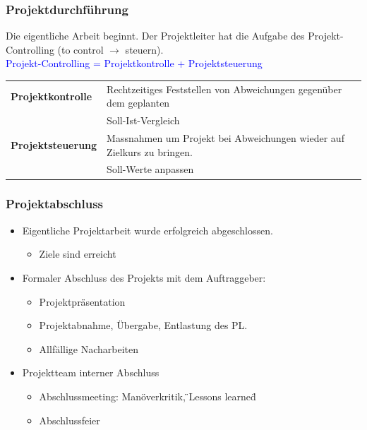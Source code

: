 \subsubsection{Projektdurchführung}
Die eigentliche Arbeit beginnt. Der Projektleiter hat die Aufgabe des Projekt-Controlling (to control $\rightarrow$ steuern).\\
\textcolor{blue}{Projekt-Controlling = Projektkontrolle + Projektsteuerung}
\renewcommand{\arraystretch}{1.2}
\begin{table}[h!]
	\begin{tabular}{|l|l|}
		\hline \textbf{Projektkontrolle} 	& Rechtzeitiges Feststellen von Abweichungen gegenüber dem geplanten \\ 
		& Soll-Ist-Vergleich\\
		\hline  \textbf{Projektsteuerung} 	& Massnahmen um Projekt bei Abweichungen wieder auf Zielkurs zu bringen. \\
		& Soll-Werte anpassen\\
		\hline
	\end{tabular}
\end{table}

\subsubsection{Projektabschluss}
\begin{itemize}
	\item Eigentliche Projektarbeit wurde erfolgreich abgeschlossen.
	\begin{itemize}
		\item Ziele sind erreicht
	\end{itemize}
	\item Formaler Abschluss des Projekts mit dem Auftraggeber:
	\begin{itemize}
		\item Projektpräsentation
		\item Projektabnahme, Übergabe, Entlastung des PL.
		\item Allfällige Nacharbeiten
	\end{itemize}
	\item Projektteam interner Abschluss
	\begin{itemize}
		\item Abschlussmeeting: Manöverkritik, \"{}Lessons learned\"{}
		\item Abschlussfeier
	\end{itemize}
\end{itemize}
\clearpage